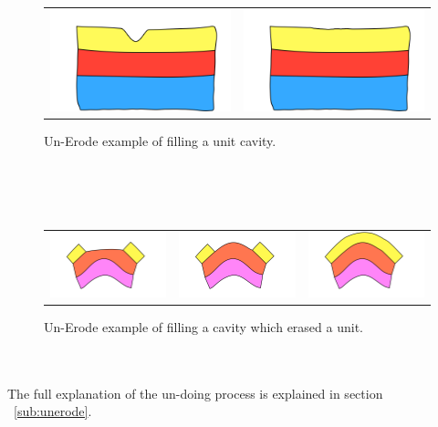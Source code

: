 \documentclass[12pt, a4paper]{report} %
\begin{document}
\begin{figure}[H]
\centering
\begin{tabular}{@{}cc@{}}
\includegraphics[width=.35\textwidth]{unErodeUpDescription0.png}&
\includegraphics[width=.35\textwidth]{unErodeUpDescription1.png}\\
\end{tabular}
\caption{Un-Erode example of filling a unit cavity.}
\label{unerodeeg}
\end{figure}
\\\\\
\begin{figure}[H]
\centering
\begin{tabular}{@{}ccc@{}}
\includegraphics[width=.35\textwidth]{unErodeConvexDescription0.png}&
\includegraphics[width=.35\textwidth]{unErodeConvexDescription1.png}&
\includegraphics[width=.35\textwidth]{unErodeConvexDescription2.png}\\
\end{tabular}
\caption{Un-Erode example of filling a cavity which erased a unit.}
\label{unerodecveg}
\end{figure}\\\\
The full explanation of the un-doing process is explained in section ~\ref{sub:unerode}.
\end{document}
